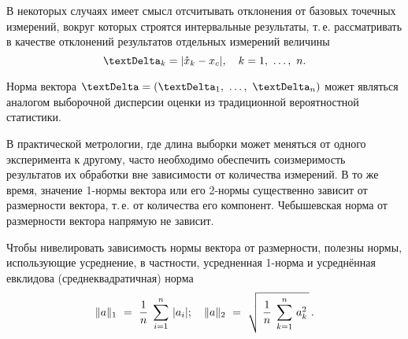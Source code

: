 \documentclass[a5paper,openany]{book}
\renewcommand{\Delta}{\text{\textDelta}}
\begin{document}
В некоторых случаях имеет смысл отсчитывать отклонения от базовых точечных измерений, 
вокруг которых строятся интервальные результаты, т.\,е. рассматривать в качестве 
отклонений результатов отдельных измерений величины 
\begin{equation}
\label{MeasurDiffsAbs} 
\Delta_k = | \mathring{x}_k  - x_c |,  \quad  k = 1, \ \ldots, \ n.  
\end{equation}  

Норма вектора $\Delta = (\Delta_{1}, \ \ldots, \ \Delta_{n})$ может являться аналогом выборочной 
дисперсии оценки из традиционной вероятностной статистики.  

В практической метрологии, где длина выборки может меняться от одного 
эксперимента к другому, часто необходимо обеспечить соизмеримость результатов 
их обработки вне зависимости от количества измерений. В то же время, значение 
1-нормы вектора или его 2-нормы существенно зависит от размерности вектора, 
т.\,е. от количества его компонент. Чебышевская норма от размерности вектора 
напрямую не зависит. 

Чтобы нивелировать зависимость нормы вектора от размерности, полезны 
нормы, использующие усреднение, в частности, усредненная 1-норма и  усреднённая евклидова (среднеквадратичная) норма 
\begin{equation*} 
\|a\|_{1} \  = \  \frac{1}{n}\;\sum_{i=1}^n \,|a_{i}|; \quad \|a\|_{2} \  = \  
\sqrt{\;\frac{1}{n}\;\sum_{k=1}^{n}\,a_{k}^{2}\,}\,. 
\index{среднеквадратичная норма} 
\end{equation*} 
\end{document}
